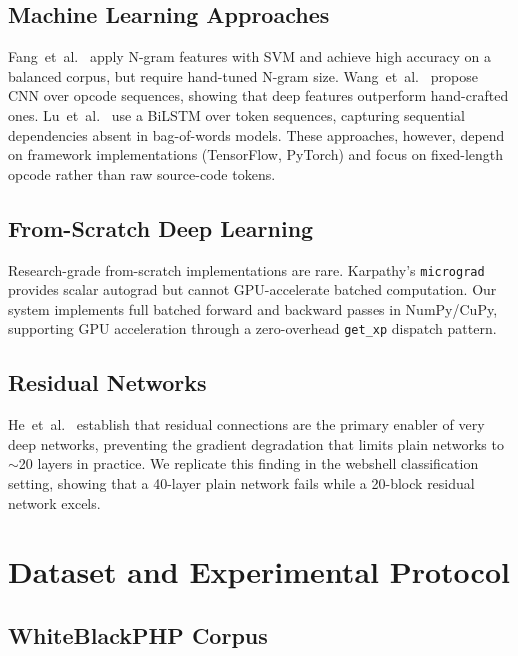 \documentclass[10pt,conference,letterpaper]{IEEEtran}
\begin{document}
\subsection{Machine Learning Approaches}

Fang~et~al.~\cite{fang2019webshell} apply N-gram features with SVM and achieve
high accuracy on a balanced corpus, but require hand-tuned N-gram size.
Wang~et~al.~\cite{wang2019deepwebshell} propose CNN over opcode sequences, showing
that deep features outperform hand-crafted ones. Lu~et~al.~\cite{lu2020webshell}
use a BiLSTM over token sequences, capturing sequential dependencies absent in
bag-of-words models. These approaches, however, depend on framework implementations
(TensorFlow, PyTorch) and focus on fixed-length opcode rather than raw source-code
tokens.

\subsection{From-Scratch Deep Learning}

Research-grade from-scratch implementations are rare. Karpathy's
\texttt{micrograd}~\cite{karpathy2022} provides scalar autograd but cannot GPU-accelerate
batched computation. Our system implements full batched forward and backward passes
in NumPy/CuPy, supporting GPU acceleration through a zero-overhead
\texttt{get\_xp} dispatch pattern.

\subsection{Residual Networks}

He~et~al.~\cite{he2015resnet,he2016identity} establish that residual connections
are the primary enabler of very deep networks, preventing the gradient degradation
that limits plain networks to $\sim$20 layers in practice. We replicate this
finding in the webshell classification setting, showing that a 40-layer plain
network fails while a 20-block residual network excels.

\section{Dataset and Experimental Protocol}
\label{sec:data}

\subsection{WhiteBlackPHP Corpus}
\end{document}
